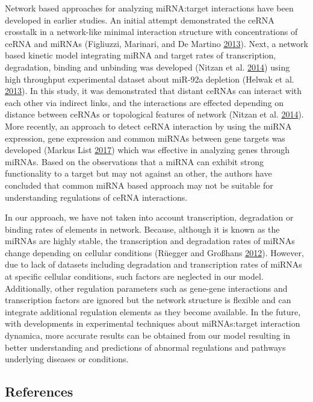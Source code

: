 \documentclass[]{article}
\begin{document}
Network based approaches for analyzing miRNA:target interactions have
been developed in earlier studies. An initial attempt demonstrated the
ceRNA crosstalk in a network-like minimal interaction structure with
concentrations of ceRNA and miRNAs (Figliuzzi, Marinari, and De Martino
\protect\hyperlink{ref-figliuzzi_micrornas_2013}{2013}). Next, a network
based kinetic model integrating miRNA and target rates of transcription,
degradation, binding and unbinding was developed (Nitzan et al.
\protect\hyperlink{ref-nitzan_interactions_2014}{2014}) using high
throughput experimental dataset about miR-92a depletion (Helwak et al.
\protect\hyperlink{ref-helwak_mapping_2013}{2013}). In this study, it
was demonstrated that distant ceRNAs can interact with each other via
indirect links, and the interactions are effected depending on distance
between ceRNAs or topological features of network (Nitzan et al.
\protect\hyperlink{ref-nitzan_interactions_2014}{2014}). More recently,
an approach to detect ceRNA interaction by using the miRNA expression,
gene expression and common miRNAs between gene targets was developed
(Markus List \protect\hyperlink{ref-markus_list_sponge_2017}{2017})
which was effective in analyzing genes through miRNAs. Based on the
observations that a miRNA can exhibit strong functionality to a target
but may not against an other, the authors have concluded that common
miRNA based approach may not be suitable for understanding regulations
of ceRNA interactions.

In our approach, we have not taken into account transcription,
degradation or binding rates of elements in network. Because, although
it is known as the miRNAs are highly stable, the transcription and
degradation rates of miRNAs change depending on cellular conditions
(Rüegger and Großhans
\protect\hyperlink{ref-ruegger_microrna_2012}{2012}). However, due to
lack of datasets including degradation and transcription rates of miRNAs
at specific cellular conditions, such factors are neglected in our
model. Additionally, other regulation parameters such as gene-gene
interactions and transcription factors are ignored but the network
structure is flexible and can integrate additional regulation elements
as they become available. In the future, with developments in
experimental techniques about miRNAs:target interaction dynamica, more
accurate results can be obtained from our model resulting in better
understanding and predictions of abnormal regulations and pathways
underlying diseases or conditions.

\hypertarget{references}{%
\subsection*{References}\label{references}}
\end{document}
